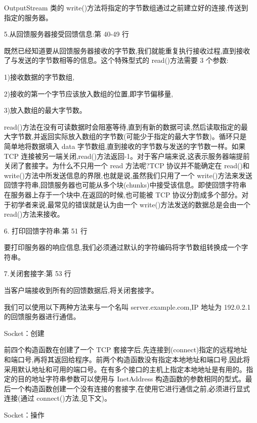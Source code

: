 		OutputStream 类的 write()方法将指定的字节数组通过之前建立好的连接,传送到指定的服务器。

		5.从回馈服务器接受回馈信息:第 40-49 行

		既然已经知道要从回馈服务器接收的字节数,我们就能重复执行接收过程,直到接收了与发送的字节数相等的信息。这个特殊型式的 read()方法需要 3 个参数:
		
		1)接收数据的字节数组,
		
		2)接收的第一个字节应该放入数组的位置,即字节偏移量,
		
		3)放入数组的最大字节数。
		
		read()方法在没有可读数据时会阻塞等待,直到有新的数据可读,然后读取指定的最大字节数,并返回实际放入数组的字节数(可能少于指定的最大字节数)。循环只是简单地将数据填入 data 字节数组,直到接收的字节数与发送的字节数一样。如果 TCP 连接被另一端关闭,read()方法返回-1。对于客户端来说,这表示服务器端提前关闭了套接字。为什么不只用一个 read 方法呢?TCP 协议并不能确定在 read()和 write()方法中所发送信息的界限,也就是说,虽然我们只用了一个 write()方法来发送回馈字符串,回馈服务器也可能从多个块(chunks)中接受该信息。即使回馈字符串在服务器上存于一个块中,在返回的时候,也可能被 TCP 协议分割成多个部分。对于初学者来说,最常见的错误就是认为由一个 write()方法发送的数据总是会由一个 read()方法来接收。

		6. 打印回馈字符串:第 51 行

		要打印服务器的响应信息,我们必须通过默认的字符编码将字节数组转换成一个字符串。

		7.关闭套接字:第 53 行

		当客户端接收到所有的回馈数据后,将关闭套接字。

		我们可以使用以下两种方法来与一个名叫 server.example.com,IP 地址为 192.0.2.1 的回馈服务器进行通信。

		Socket：创建

		

		前四个构造函数在创建了一个 TCP 套接字后,先连接到(connect)指定的远程地址和端口号,再将其返回给程序。前两个构造函数没有指定本地地址和端口号,因此将采用默认地址和可用的端口号。在有多个接口的主机上指定本地地址是有用的。指定的目的地址字符串参数可以使用与 InetAddress 构造函数的参数相同的型式。最后一个构造函数创建一个没有连接的套接字,在使用它进行通信之前,必须进行显式连接(通过 connect()方法,见下文)。

		Socket：操作

		

